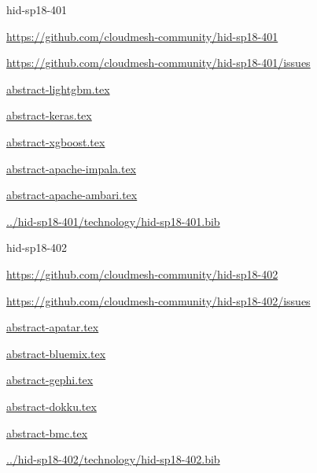\begin{IU}

hid-sp18-401

\url{https://github.com/cloudmesh-community/hid-sp18-401}

\url{https://github.com/cloudmesh-community/hid-sp18-401/issues}

\href{https://github.com/cloudmesh-community/hid-sp18-401/blob/master//technology/abstract-lightgbm.tex}{abstract-lightgbm.tex}

\href{https://github.com/cloudmesh-community/hid-sp18-401/blob/master//technology/abstract-keras.tex}{abstract-keras.tex}

\href{https://github.com/cloudmesh-community/hid-sp18-401/blob/master//technology/abstract-xgboost.tex}{abstract-xgboost.tex}

\href{https://github.com/cloudmesh-community/hid-sp18-401/blob/master//technology/abstract-apache-impala.tex}{abstract-apache-impala.tex}

\href{https://github.com/cloudmesh-community/hid-sp18-401/blob/master//technology/abstract-apache-ambari.tex}{abstract-apache-ambari.tex}

\href{https://github.com/cloudmesh-community/hid-sp18-401/blob/master//technology/hid-sp18-401.bib}{../hid-sp18-401/technology/hid-sp18-401.bib}

\end{IU}


\begin{IU}

hid-sp18-402

\url{https://github.com/cloudmesh-community/hid-sp18-402}

\url{https://github.com/cloudmesh-community/hid-sp18-402/issues}

\href{https://github.com/cloudmesh-community/hid-sp18-402/blob/master//technology/abstract-apatar.tex}{abstract-apatar.tex}

\href{https://github.com/cloudmesh-community/hid-sp18-402/blob/master//technology/abstract-bluemix.tex}{abstract-bluemix.tex}

\href{https://github.com/cloudmesh-community/hid-sp18-402/blob/master//technology/abstract-gephi.tex}{abstract-gephi.tex}

\href{https://github.com/cloudmesh-community/hid-sp18-402/blob/master//technology/abstract-dokku.tex}{abstract-dokku.tex}

\href{https://github.com/cloudmesh-community/hid-sp18-402/blob/master//technology/abstract-bmc.tex}{abstract-bmc.tex}

\href{https://github.com/cloudmesh-community/hid-sp18-402/blob/master//technology/hid-sp18-402.bib}{../hid-sp18-402/technology/hid-sp18-402.bib}

\end{IU}


